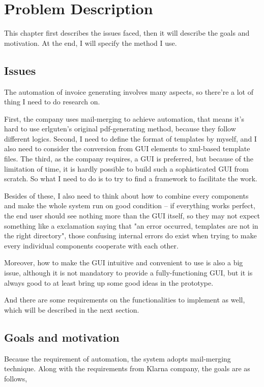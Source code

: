 \documentclass{report}
\begin{document}
\chapter{Problem Description}
  This chapter first describes the issues faced, then it will describe the goals and motivation. At the end, I will specify the method I use.

\section{Issues}
  The automation of invoice generating involves many aspects, so there're a lot of thing I need to do research on. 

  First, the company uses mail-merging to achieve automation, that means it's hard to use erlguten's original pdf-generating method, because they follow different logics. Second, I need to define the format of templates by myself, and I also need to consider the conversion from GUI elements to xml-based template files. The third, as the company requires, a GUI is preferred, but because of the limitation of time, it is hardly possible to build such a sophisticated GUI from scratch. So what I need to do is to try to find a framework to facilitate the work. 

  Besides of these, I also need to think about how to combine every components and make the whole system run on good condition -- if everything works perfect, the end user should see nothing more than the GUI itself, so they may not expect something like a exclamation saying that "an error occurred, templates are not in the right directory", those confusing internal errors do exist when trying to make every individual components cooperate with each other.

  Moreover, how to make the GUI intuitive and convenient to use is also a big issue, although it is not mandatory to provide a fully-functioning GUI, but it is always good to at least bring up some good ideas in the prototype. 

  And there are some requirements on the functionalities to implement as well, which will be described in the next section.

\section{Goals and motivation}

  Because the requirement of automation, the system adopts mail-merging technique. Along with the requirements from Klarna company, the goals are as follows,
\end{document}
